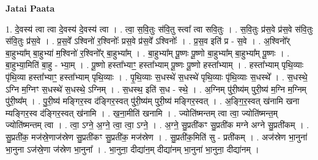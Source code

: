 \documentclass[17pt]{extarticle}
\begin{document}
\textbf{Jatai Paata} \newline

1. दे॒वस्य॑ त्वा त्वा दे॒वस्य॑ दे॒वस्य॑ त्वा । . त्वा॒ स॒वि॒तुः स॑वि॒तु स्त्वा᳚ त्वा सवि॒तुः । . स॒वि॒तुः प्र॑स॒वे प्र॑स॒वे स॑वि॒तुः स॑वि॒तुः प्र॑स॒वे । . प्र॒स॒वे᳚ ऽश्विनो॑ र॒श्विनोः᳚ प्रस॒वे प्र॑स॒वे᳚ ऽश्विनोः᳚ । . प्र॒स॒व इति॑ प्र - स॒वे । . अ॒श्विनो᳚र् बा॒हुभ्या᳚म् बा॒हुभ्या॑ म॒श्विनो॑ र॒श्विनो᳚र् बा॒हुभ्या᳚म् । . बा॒हुभ्या᳚म् पू॒ष्णः पू॒ष्णो बा॒हुभ्या᳚म् बा॒हुभ्या᳚म् पू॒ष्णः । . बा॒हुभ्या॒मिति॑ बा॒हु - भ्या॒म् । . पू॒ष्णो हस्ता᳚भ्याꣳ॒॒ हस्ता᳚भ्याम् पू॒ष्णः पू॒ष्णो हस्ता᳚भ्याम् । . हस्ता᳚भ्याम् पृथि॒व्याः पृ॑थि॒व्या हस्ता᳚भ्याꣳ॒॒ हस्ता᳚भ्याम् पृथि॒व्याः । . पृ॒थि॒व्याः स॒धस्थे॑ स॒धस्थे॑ पृथि॒व्याः पृ॑थि॒व्याः स॒धस्थे᳚ । . स॒धस्थे॒ ऽग्नि म॒ग्निꣳ स॒धस्थे॑ स॒धस्थे॒ ऽग्निम् । . स॒धस्थ॒ इति॑ स॒ध - स्थे॒ । . अ॒ग्निम् पु॑री॒ष्य॑म् पुरी॒ष्य॑ म॒ग्नि म॒ग्निम् पु॑री॒ष्य᳚म् । . पु॒री॒ष्य॑ मङ्गिर॒स्व द॑ङ्गिर॒स्वत् पु॑री॒ष्य॑म् पुरी॒ष्य॑ मङ्गिर॒स्वत् । . अ॒ङ्गि॒र॒स्वत् ख॑नामि खना म्यङ्गिर॒स्व द॑ङ्गिर॒स्वत् ख॑नामि । . ख॒ना॒मीति॑ खनामि । . ज्योति॑ष्मन्तम् त्वा त्वा॒ ज्योति॑ष्मन्त॒म् ज्योति॑ष्मन्तम् त्वा । . त्वा॒ ऽग्ने॒ अ॒ग्ने॒ त्वा॒ त्वा॒ ऽग्ने॒ । . अ॒ग्ने॒ सु॒प्रती॑कꣳ सु॒प्रती॑क मग्ने अग्ने सु॒प्रती॑कम् । . सु॒प्रती॑क॒ मज॑स्रे॒णाज॑स्रेण सु॒प्रती॑कꣳ सु॒प्रती॑क॒ मज॑स्रेण । . सु॒प्रती॑क॒मिति॑ सु - प्रती॑कम् । . अज॑स्रेण भा॒नुना॑ भा॒नुना ऽज॑स्रे॒णा ज॑स्रेण भा॒नुना᳚ । . भा॒नुना॒ दीद्या॑न॒म् दीद्या॑नम् भा॒नुना॑ भा॒नुना॒ दीद्या॑नम् । \newline
\end{document}
